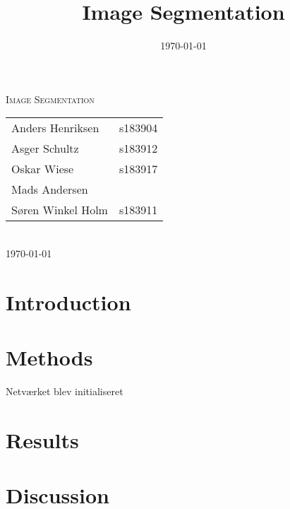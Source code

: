 \documentclass[12pt,fleqn]{article}
\title{Image Segmentation}
\author{}
\date{\today}
\begin{document}

\begin{titlepage}
	\begin{center}
		\textsc{\LARGE Image Segmentation}\\
		[1.0cm]
		{
		\large
		\begin{tabular}{lr}
			Anders Henriksen&s183904\\
			Asger Schultz&s183912\\
			Oskar Wiese&s183917\\
			Mads Andersen&\\
			Søren Winkel Holm&s183911
		\end{tabular}
		}\\
		[0.5cm]
		\textsc{\large \today}
	\end{center}
\end{titlepage}
\tableofcontents \newpage


\section{Introduction}

\section{Methods}
Netværket blev initialiseret

\section{Results}

\section{Discussion}
\end{document}
